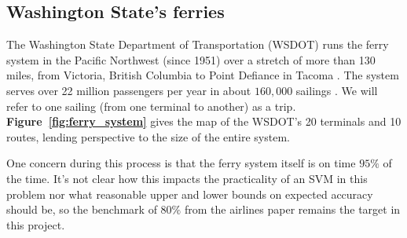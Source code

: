 \documentclass[11pt]{article} %
\begin{document}
\subsection{Washington State's ferries}
\label{sec:wsdot}
The Washington State Department of Transportation (WSDOT) runs the ferry system
in the Pacific Northwest (since 1951) over a stretch of more than 130 miles, from 
Victoria, British Columbia to Point Defiance in Tacoma \cite{wsdotFleet}. The system 
serves over 22 million passengers per year in about $160,000$ sailings 
\cite{wsfTraffic}.  We will refer to one sailing (from one terminal to another) as a 
trip.  \textbf{Figure~\ref{fig:ferry_system}} gives the map of the WSDOT's 20 
terminals and 10 routes, lending perspective to the size of the entire system.

One concern during this process is that the ferry 
system itself is on time $95\%$ of the time. It's not clear how this impacts the
practicality of an SVM in this problem nor what reasonable upper and lower bounds
on expected accuracy should be, so the benchmark of $80\%$ from the
airlines paper \cite{smith2008decision} remains the target in this project.
\end{document}
